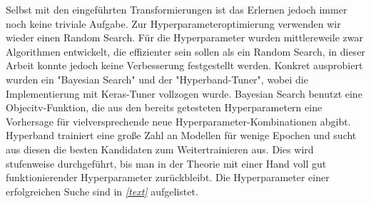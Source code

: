 \newline
Selbst mit den eingeführten Transformierungen ist das Erlernen jedoch immer noch keine triviale Aufgabe. Zur Hyperparameteroptimierung verwenden wir wieder einen Random Search. Für die Hyperparameter wurden mittlereweile zwar Algorithmen entwickelt, die effizienter sein sollen als ein Random Search, in dieser Arbeit konnte jedoch keine Verbesserung festgestellt werden. Konkret ausprobiert wurden ein "Bayesian Search" und der "Hyperband-Tuner", wobei die Implementierung mit Keras-Tuner vollzogen wurde. Bayesian Search benutzt eine Objecitv-Funktion, die aus den bereits getesteten Hyperparametern eine Vorhersage für vielversprechende neue Hyperparameter-Kombinationen abgibt. Hyperband trainiert eine große Zahl an Modellen für wenige Epochen und sucht aus diesen die besten Kandidaten zum Weitertrainieren aus. Dies wird stufenweise durchgeführt, bis man in der Theorie mit einer Hand voll gut funktionierender Hyperparameter zurückbleibt. Die Hyperparameter einer erfolgreichen Suche sind in \textit{\autoref{text}} aufgelistet.

